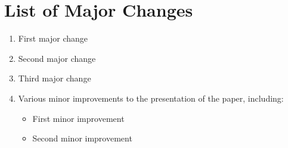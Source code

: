 \documentclass[a4paper,12pt]{article}
\begin{document}
\section*{List of Major Changes}

\begin{enumerate}
    \item First major change
    \item Second major change
    \item Third major change

    \item[*] Various minor improvements to the presentation of the paper, including:
    \begin{itemize}
        \item First minor improvement
        \item Second minor improvement
    \end{itemize}
\end{enumerate}
\end{document}
